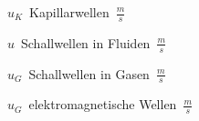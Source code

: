 \begin{center}
	\begin{minipage}{0.4\textwidth}
		\unit{$u_K$}{Kapillarwellen}{$\frac{m}{s}$}
	\end{minipage}%
	\begin{minipage}{0.2\textwidth}
	\end{minipage}
\end{center}
\begin{center}
	\begin{minipage}{0.3\textwidth}
		\unit{$u$}{Schallwellen in Fluiden}{$\frac{m}{s}$}
	\end{minipage}%
	\begin{minipage}{0.3\textwidth}
	\end{minipage}
\end{center}
\begin{center}
	\begin{minipage}{0.3\textwidth}
		\unit{$u_G$}{Schallwellen in Gasen}{$\frac{m}{s}$}
	\end{minipage}%
	\begin{minipage}{0.3\textwidth}
	\end{minipage}
\end{center}
\begin{center}
	\begin{minipage}{0.3\textwidth}
		\unit{$u_G$}{elektromagnetische Wellen}{$\frac{m}{s}$}
	\end{minipage}%
	\begin{minipage}{0.3\textwidth}
	\end{minipage}
\end{center}


